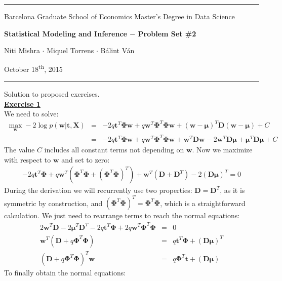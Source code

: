 \documentclass[a4paper, 11pt]{article}\usepackage[]{graphicx}\usepackage[]{color}
\newcommand{\header}[4]{
	\begin{center}
		\rule{\linewidth}{0.5pt}
		
		{\small{#1}}
      
        \vspace{0.2in}
        
		{\large{#2}}
		
        \vspace{0.2in}
        
		{\small{#3}}
		
		\vspace{0.15in}
		
		{#4}
		
		\vspace{-0.1in}
		\rule{\linewidth}{0.6pt}
	\end{center}
}
\begin{document}
 
\header{\sc Barcelona Graduate School of Economics \hfill Master's Degree in Data Science}{\bf Statistical Modeling and Inference $-$ Problem Set \#2}{\sc Niti Mishra $\cdot$ Miquel Torrens $\cdot$ B\'alint V\'an}{October 18\textsuperscript{th}, 2015}
Solution to proposed exercises.\\
\newline \textbf{\underline{Exercise 1}}\\
\newline We need to solve:
\begin{eqnarray}
\max_{\mathbf{w}} -2 \log p(\mathbf{w | t, X}) &=&  -2q \mathbf{t}^T \mathbf{\Phi w} + q \mathbf{w}^T \mathbf{\Phi}^T \mathbf{\Phi w} + (\mathbf{w - \mu})^T \mathbf{D} (\mathbf{w - \mu}) + C \nonumber \\
&=&  -2q \mathbf{t}^T \mathbf{\Phi w} + q \mathbf{w}^T \mathbf{\Phi}^T \mathbf{\Phi w} + \mathbf{w}^T \mathbf{D w} - 2 \mathbf{w}^T \mathbf{D} \mathbf{\mu} + \mathbf{\mu}^T \mathbf{D \mu} + C \nonumber
\end{eqnarray}
The value $C$ includes all constant terms not depending on $\mathbf{w}$. Now we maximize with respect to $\mathbf{w}$ and set to zero:
\begin{eqnarray}
-2q \mathbf{t}^T \mathbf{\Phi} + q \mathbf{w}^T \left(\mathbf{\Phi}^T \mathbf{\Phi} + \left( \mathbf{\Phi}^T \mathbf{\Phi} \right)^T \right) + \mathbf{w}^T \left( \mathbf{D} + \mathbf{D}^T \right) - 2 \left( \mathbf{D} \mathbf{\mu} \right)^T = 0 \nonumber
\end{eqnarray}
During the derivation we will recurrently use two properties: $\mathbf{D} = \mathbf{D}^T$, as it is symmetric by construction, and $\left( \mathbf{\Phi}^T \mathbf{\Phi} \right)^T = \mathbf{\Phi}^T \mathbf{\Phi}$, which is a straightforward calculation. We just need to rearrange terms to reach the normal equations:
\begin{eqnarray}
2 \mathbf{w}^T\mathbf{D} -2 \mathbf{\mu}^T \mathbf{D}^T -2 q \mathbf{t}^T \mathbf{\Phi} + 2q\mathbf{w}^T \mathbf{\Phi}^T \mathbf{\Phi} &=& 0 \nonumber \\
\mathbf{w}^T \left( \mathbf{D} + q \mathbf{\Phi}^T \mathbf{\Phi} \right) &=& q\mathbf{t}^T \mathbf{\Phi} + \left( \mathbf{D\mu} \right)^T  \nonumber \\
\left( \mathbf{D} + q \mathbf{\Phi}^T \mathbf{\Phi} \right)^T \mathbf{w} &=& q\mathbf{\Phi}^T \mathbf{t} + \left( \mathbf{D\mu} \right) \nonumber
\end{eqnarray}
To finally obtain the normal equations:
\end{document}
